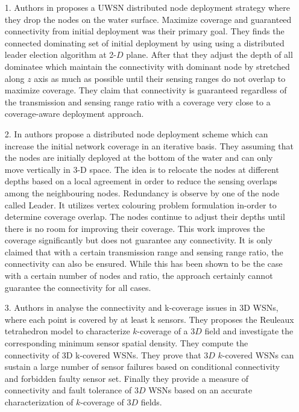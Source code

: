 \documentclass[12pt]{article}
\begin{document}
 \begin{itemize}
 \item[1.] Authors in \cite{senel2013autonomous} proposes a UWSN distributed node deployment strategy where they drop the nodes on the water surface. Maximize coverage and guaranteed connectivity from initial deployment was their primary goal. They finds the connected dominating set of initial deployment by using using a distributed leader election algorithm at 2-$D$ plane. After that they adjust the depth of all dominatee which maintain the connectivity with dominant node by stretched along $z$ axis as much as possible until their sensing ranges do not overlap to maximize coverage. They claim  that connectivity is guaranteed regardless of the transmission and sensing range
ratio with a coverage very close to a coverage-aware deployment
approach.

 \item[2.] In \cite{akkaya2009self} authors propose a distributed node deployment scheme which can increase the initial network coverage in an iterative basis. They assuming that the nodes are initially deployed at the bottom of the water and can only move vertically in 3-D space. The idea is to relocate the nodes at different depths based on a local agreement in order to reduce the sensing overlaps among the neighbouring nodes. Redundancy is observe by one  of the node called Leader. It utilizes vertex colouring problem formulation in-order to determine coverage overlap. The nodes continue to adjust their depths until there is no room for improving their coverage. This work improves the coverage significantly but
does not guarantee any connectivity. It is only claimed that
with a certain transmission range and sensing range ratio, the
connectivity can also be ensured. While this has been shown
to be the case with a certain number of nodes and ratio, the
approach certainly cannot guarantee the connectivity for all
cases.
 
 \item[3.] Authors in \cite{ammari2010study} analyse  the connectivity and k-coverage issues in 3D WSNs, where each point is covered by at least k sensors. They proposes  the Reuleaux tetrahedron model to characterize $k$-coverage of a $3D$ field and investigate the corresponding minimum sensor spatial density. They compute the connectivity of 3D k-covered WSNs. They prove that $3D$ $k$-covered WSNs can sustain a large number of sensor failures based on conditional connectivity and forbidden faulty sensor set. Finally they provide a measure of connectivity and
fault tolerance of $3D$ WSNs based on an accurate characterization of $k$-coverage of $3D$ fields.


\end{itemize}
\end{document}
